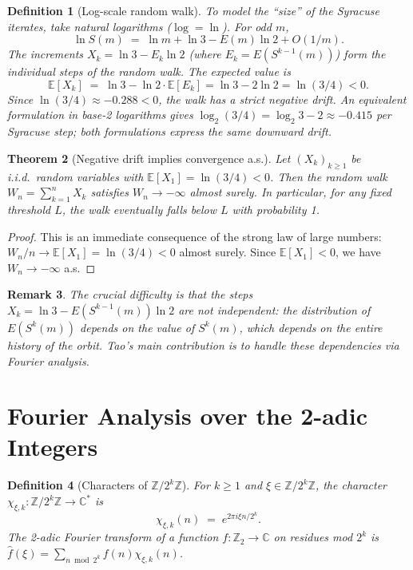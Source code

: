 \documentclass[12pt,a4paper]{article}
\newtheorem{theorem}{Theorem}[section]
\newtheorem{definition}[theorem]{Definition}
\newtheorem{remark}[theorem]{Remark}
\begin{document}
\begin{definition}[Log-scale random walk]\label{def:rw}
To model the ``size'' of the Syracuse iterates, take natural logarithms ($\log = \ln$).
For odd $m$,
\[
  \ln S(m) \;=\; \ln m + \ln 3 - E(m) \ln 2 + O(1/m).
\]
The increments $X_k = \ln 3 - E_k \ln 2$ (where $E_k = E(S^{k-1}(m))$) form the
individual steps of the random walk. The expected value is
\[
  \mathbb{E}[X_k] \;=\; \ln 3 - \ln 2 \cdot \mathbb{E}[E_k] = \ln 3 - 2\ln 2 = \ln(3/4) < 0.
\]
Since $\ln(3/4) \approx -0.288 < 0$, the walk has a strict negative drift.
An equivalent formulation in base-2 logarithms gives $\log_2(3/4) = \log_2 3 - 2 \approx -0.415$
per Syracuse step; both formulations express the same downward drift.
\end{definition}

\begin{theorem}[Negative drift implies convergence a.s.]\label{thm:drift}
Let $(X_k)_{k \geq 1}$ be i.i.d.\ random variables with $\mathbb{E}[X_1] = \ln(3/4) < 0$.
Then the random walk $W_n = \sum_{k=1}^n X_k$ satisfies $W_n \to -\infty$ almost surely.
In particular, for any fixed threshold $L$, the walk eventually falls below $L$ with
probability 1.
\end{theorem}

\begin{proof}
This is an immediate consequence of the strong law of large numbers: $W_n/n \to \mathbb{E}[X_1] = \ln(3/4) < 0$
almost surely. Since $\mathbb{E}[X_1] < 0$, we have $W_n \to -\infty$ a.s.
\end{proof}

\begin{remark}\label{rem:not_independent}
The crucial difficulty is that the steps $X_k = \ln 3 - E(S^{k-1}(m)) \ln 2$ are
\emph{not} independent: the distribution of $E(S^k(m))$ depends on the value of
$S^k(m)$, which depends on the entire history of the orbit. Tao's main contribution
is to handle these dependencies via Fourier analysis.
\end{remark}

\section{Fourier Analysis over the 2-adic Integers}

\begin{definition}[Characters of $\mathbb{Z}/2^k\mathbb{Z}$]\label{def:characters}
For $k \geq 1$ and $\xi \in \mathbb{Z}/2^k\mathbb{Z}$, the \emph{character}
$\chi_{\xi,k}\colon \mathbb{Z}/2^k\mathbb{Z} \to \mathbb{C}^*$ is
\[
  \chi_{\xi,k}(n) \;=\; e^{2\pi i \xi n / 2^k}.
\]
The 2-adic Fourier transform of a function $f\colon \mathbb{Z}_2 \to \mathbb{C}$
on residues mod $2^k$ is $\hat{f}(\xi) = \sum_{n \bmod 2^k} f(n) \chi_{\xi,k}(n)$.
\end{definition}
\end{document}

